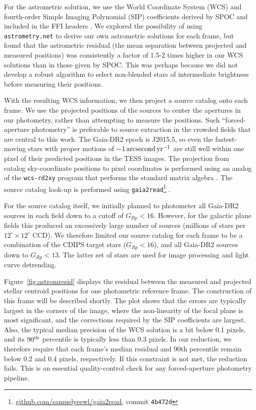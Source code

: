 \documentclass[12pt,twocolumn,tighten]{aastex62}
\begin{document}
For the astrometric solution, we use the World Coordinate System (WCS)
and fourth-order Simple Imaging Polynomial (SIP) coefficients derived
by SPOC and included in the FFI headers
\citep[][Sec.~8]{pence_fits_2010}.  We explored the possibility of
using \texttt{astrometry.net} \citep{lang_2010} to derive our own
astrometric solutions for each frame, but found that the astrometric
residual (the mean separation between projected and measured
positions) was consistently a factor of 1.5-2 times higher in our WCS
solutions than in those given by SPOC.  This was perhaps because we
did not develop a robust algorithm to select non-blended stars of
intermediate brightness before measuring their positions.

With the resulting WCS information, we then project a source catalog
onto each frame.  We use the projected positions of the sources to
center the apertures in our photometry, rather than attempting to
measure the positions.  Such ``forced-aperture photometry'' is
preferable to source extraction in the crowded fields that are central
to this work.  The Gaia-DR2 epoch is J2015.5, so even the
fastest-moving stars with proper motions of $\sim$$1\,{\rm
arcsecond}\,{\rm yr}^{-1}$ are still well within one pixel of their
predicted positions in the TESS images.  The projection from catalog
sky-coordinate positions to pixel coordinates is performed using an
analog of the \texttt{wcs-rd2xy} program that performs the standard
matrix algebra \citep{lang_2010}.  The source catalog look-up is
performed using
\texttt{gaia2read}\footnote{\url{github.com/samuelyeewl/gaia2read}, commit \texttt{4b472d}}
\citep{kim_2018_gaia2read}.

For the source catalog itself, we initially planned to photometer all
Gaia-DR2 sources in each field down to a cutoff of $G_{Rp} < 16$.
However, for the galactic plane fields this produced an excessively
large number of sources (millions of stars per
$12^\circ\times12^\circ$ CCD).  We therefore limited our source
catalog for each frame to be a combination of the CDIPS target stars
($G_{Rp} < 16$), and all Gaia-DR2 sources down to $G_{Rp} < 13$.  The
latter set of stars are used for image processing and light curve
detrending.

Figure~\ref{fig:astromresid} displays the residual between the
measured and projected stellar centroid positions for one photometric
reference frame.  The construction of this frame will be described
shortly.  The plot shows that the errors are typically largest in the
corners of the image, where the non-linearity of the focal plane is
most significant, and the corrections required by the SIP coefficients
are largest.  Also, the typical median precision of the WCS solution
is a bit below 0.1 pixels, and its $90^{\rm th}$ percentile is
typically less than 0.3 pixels.  In our reduction, we therefore
require that each frame's median residual and 90th percentile remain
below 0.2 and 0.4 pixels, respectively. If this constraint is not met,
the reduction fails.  This is an essential quality-control check for
any forced-aperture photometry pipeline.
\end{document}
